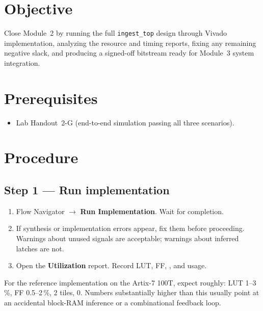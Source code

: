 \documentclass[11pt,letterpaper]{article}
\begin{document}

\section{Objective}
Close Module~2 by running the full \texttt{ingest\_top} design through Vivado implementation, analyzing the resource and timing reports, fixing any remaining negative slack, and producing a signed-off bitstream ready for Module~3 system integration.

\section{Prerequisites}
\begin{itemize}[leftmargin=2em]
	\item Lab Handout~2-G (end-to-end simulation passing all three scenarios).
\end{itemize}

\section{Procedure}

\subsection{Step 1 --- Run implementation}
\begin{enumerate}[leftmargin=2em]
	\item Flow Navigator $\to$ \textbf{Run Implementation}. Wait for completion.
	\item If synthesis or implementation errors appear, fix them before proceeding. Warnings about unused signals are acceptable; warnings about inferred latches are not.
	\item Open the \textbf{Utilization} report. Record \mbox{LUT}, \mbox{FF}, \BRAM{}, and \DSP{} usage.
\end{enumerate}

\begin{tcolorbox}[infobox={Expected utilization envelope}]
	For the reference implementation on the Artix-7 100T, expect roughly: \mbox{LUT} 1--3\,\%, \mbox{FF} 0.5--2\,\%, \BRAM{} 2 tiles, \DSP{} 0. Numbers substantially higher than this usually point at an accidental block-\mbox{RAM} inference or a combinational feedback loop.
\end{tcolorbox}

\newpage
\end{document}
